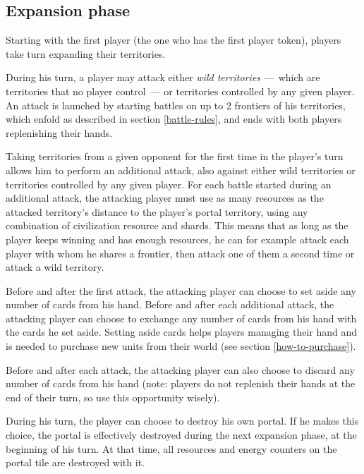 \documentclass[a4paper]{article}
\begin{document}
\newpage
    \subsection{Expansion phase}
        \label{expansion}    
        Starting with the first player (the one who has the first player token),
        players take turn expanding their territories.
        
        During his turn, a player may attack either \textit{wild territories}
        ---~which are territories that no player control~---
        or territories controlled by any given player.
        An attack is launched by starting battles on up to 2 frontiers of his territories,
        which enfold as described in section \ref{battle-rules},
        and ends with both players replenishing their hands.
        
        Taking territories from a given opponent for the first time in the player's turn
        allows him to perform an additional attack,
        also against either wild territories or territories controlled by any given player.
        For each battle started during an additional attack,
        the attacking player must use as many resources as the attacked
        territory's distance to the player's portal territory,
        using any combination of civilization resource and shards.
        This means that as long as the player keeps winning and has enough resources,
        he can for example attack each player with whom he shares a frontier,
        then attack one of them a second time or attack a wild territory.
        
        Before and after the first attack,
        the attacking player can choose to set aside
        any number of cards from his hand.
        Before and after each additional attack,
        the attacking player can choose to exchange any number of cards
        from his hand with the cards he set aside.
        Setting aside cards helps players managing their hand
        and is needed to purchase new units from their world
        (see section \ref{how-to-purchase}).
        
        Before and after each attack,
        the attacking player can also choose to discard any number of cards
        from his hand
        (note: players do not replenish their hands at the end of their turn,
        so use this opportunity wisely).
        
        During his turn, the player can choose to destroy his own portal.
        If he makes this choice, the portal is effectively destroyed
        during the next expansion phase, at the beginning of his turn.
        At that time, all resources and energy counters on the portal tile
        are destroyed with it. 
        
\end{document}
